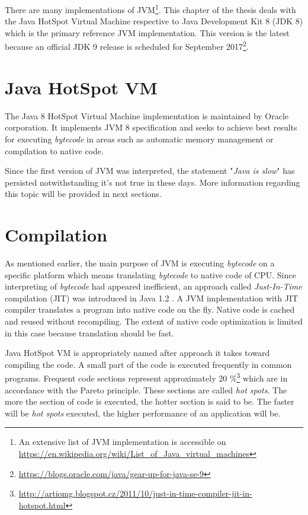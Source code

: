 \documentclass[
  digital, %
  oneside,
  notable, %
  nolof,     %
  nolot     %
]{fithesis3}
\begin{document}
There are many implementations of JVM\footnote{An extensive list of JVM implementation is accessible on \url{https://en.wikipedia.org/wiki/List_of_Java_virtual_machines}}. This chapter of the thesis deals with the Java HotSpot Virtual Machine respective to Java Development Kit 8 (JDK 8) which is the primary reference JVM implementation. This version is the latest because an official JDK 9 release is scheduled for September 2017\footnote{\url{https://blogs.oracle.com/java/gear-up-for-java-se-9}}.

\section{Java HotSpot VM}
The Java 8 HotSpot Virtual Machine implementation is maintained by Oracle corporation. It implements JVM 8 specification and seeks to achieve best results for executing \textit{bytecode} in areas such as automatic memory management or compilation to native code.

Since the first version of JVM was interpreted, the statement "\textit{Java is slow}" has persisted notwithstanding it's not true in these days. More information regarding this topic will be provided in next sections.

\section{Compilation}

As mentioned earlier, the main purpose of JVM is executing \textit{bytecode} on a specific platform which means translating \textit{bytecode} to native code of CPU. Since interpreting of \textit{bytecode} had appeared inefficient, an approach called \textit{Just-In-Time} compilation (JIT) was introduced in Java 1.2 \cite{javavsc}. A JVM implementation with JIT compiler translates a program into native code on the fly. Native code is cached and reused without recompiling. The extent of native code optimization is limited in this case because translation should be fast.

Java HotSpot VM is appropriately named after approach it takes toward compiling the code. A small part of the code is executed frequently in common programs. Frequent code sections represent approximately 20 \%\footnote{\url{http://artiomg.blogspot.cz/2011/10/just-in-time-compiler-jit-in-hotspot.html}} which are in accordance with the Pareto principle. These sections are called \textit{hot spots}. The more the section of code is executed, the hotter section is said to be. The faster will be \textit{hot spots} executed, the higher performance of an application will be. \cite{scott}
\end{document}
